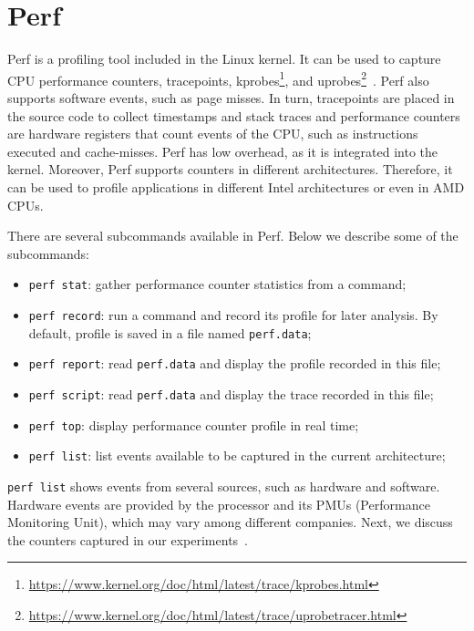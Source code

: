 \section{Perf}

Perf is a profiling tool included in the Linux kernel. It can be used to capture CPU performance counters, tracepoints, kprobes\footnote{\url{https://www.kernel.org/doc/html/latest/trace/kprobes.html}}, and uprobes\footnote{\url{https://www.kernel.org/doc/html/latest/trace/uprobetracer.html}}~\cite{perf_wiki}. Perf also supports software events, such as page misses. In turn, tracepoints are placed in the source code to collect timestamps and stack traces and performance counters are hardware registers that count events of the CPU, such as instructions executed and cache-misses. Perf has low overhead, as it is integrated into the kernel. Moreover, Perf supports counters in different architectures. Therefore, it can be used to profile applications in different Intel architectures or even in AMD CPUs.

There are several subcommands available in Perf. Below we describe some of the subcommands:

\begin{itemize}
	\item \texttt{perf stat}: gather performance counter statistics from a command;
    \item \texttt{perf record}: run a command and record its profile for later analysis. By default, profile is saved in a file named \texttt{perf.data};
    \item \texttt{perf report}: read \texttt{perf.data} and display the profile recorded in this file;
    \item \texttt{perf script}: read \texttt{perf.data} and display the trace recorded in this file;
	\item \texttt{perf top}: display performance counter profile in real time;
	\item \texttt{perf list}: list events available to be captured in the current architecture;
\end{itemize}

\texttt{perf list} shows events from several sources, such as hardware and software. Hardware events are provided by the processor and its PMUs (Performance Monitoring Unit), which may vary among different companies. Next, we discuss the counters captured in our experiments~\cite{intel_pmu}.

